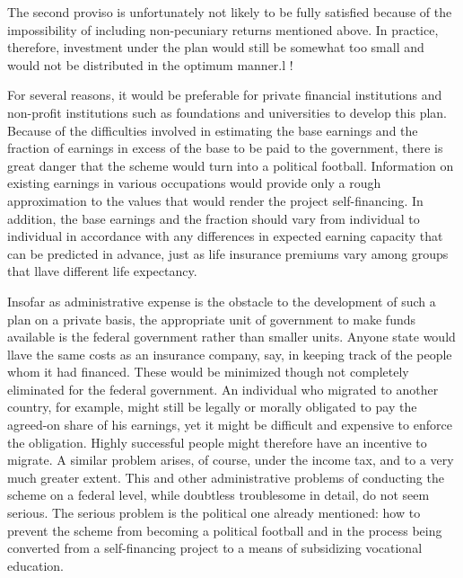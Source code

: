 \documentclass[11pt,openany]{book}
\begin{document}
The second proviso is unfortunately not likely to be fully satisfied because of the impossibility of including non-pecuniary returns mentioned above. In practice, therefore, investment under the plan would still be somewhat too small and would not be distributed in the optimum manner.l !

For several reasons, it would be preferable for private financial institutions and non-profit institutions such as foundations and universities to develop this plan. Because of the difficulties involved in estimating the base earnings and the fraction of earnings in excess of the base to be paid to the government, there is great danger that the scheme would turn into a political football. Information on existing earnings in various occupations would provide only a rough approximation to the values that would render the project self-financing. In addition, the base earnings and the fraction should vary from individual to individual in accordance with any differences in expected earning capacity that can be predicted in advance, just as life insurance premiums vary among groups that llave different life expectancy.

Insofar as administrative expense is the obstacle to the development of such a plan on a private basis, the appropriate unit of government to make funds available is the federal government rather than smaller units. Anyone state would llave the same costs as an insurance company, say, in keeping track of the people whom it had financed. These would be minimized though not completely eliminated for the federal government. An individual who migrated to another country, for example, might still be legally or morally obligated to pay the agreed-on share of his earnings, yet it might be difficult and expensive to enforce the obligation. Highly successful people might therefore have an incentive to migrate. A similar problem arises, of course, under the income tax, and to a very much greater extent. This and other administrative problems of conducting the scheme on a federal level, while doubtless troublesome in detail, do not seem serious. The serious problem is the political one already mentioned: how to prevent the scheme from becoming a political football and in the process being converted from a self-financing project to a means of subsidizing vocational education.
\end{document}
